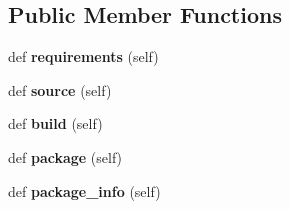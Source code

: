 \subsection*{Public Member Functions}
\begin{DoxyCompactItemize}
\item 
def {\bfseries requirements} (self)\hypertarget{classconanfile_1_1_tomato_conan_a494a7b4df997b45646bd2b0db4a1e82e}{}\label{classconanfile_1_1_tomato_conan_a494a7b4df997b45646bd2b0db4a1e82e}

\item 
def {\bfseries source} (self)\hypertarget{classconanfile_1_1_tomato_conan_a49a99296bd0b5ca80e884e800eb7c32b}{}\label{classconanfile_1_1_tomato_conan_a49a99296bd0b5ca80e884e800eb7c32b}

\item 
def {\bfseries build} (self)\hypertarget{classconanfile_1_1_tomato_conan_a7e2e46dff564879db042be1dc780f717}{}\label{classconanfile_1_1_tomato_conan_a7e2e46dff564879db042be1dc780f717}

\item 
def {\bfseries package} (self)\hypertarget{classconanfile_1_1_tomato_conan_ad62eb21cdf25bbad2ac66f7ec7db923e}{}\label{classconanfile_1_1_tomato_conan_ad62eb21cdf25bbad2ac66f7ec7db923e}

\item 
def {\bfseries package\+\_\+info} (self)\hypertarget{classconanfile_1_1_tomato_conan_ad437531b495d89edaa58a0d04bd89cc8}{}\label{classconanfile_1_1_tomato_conan_ad437531b495d89edaa58a0d04bd89cc8}

\end{DoxyCompactItemize}
